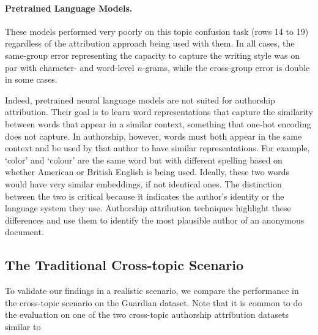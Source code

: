 \documentclass[11pt]{article}
\begin{document}
\paragraph{Pretrained Language Models.} These models performed very poorly on this topic confusion task (rows 14 to 19) regardless of the attribution approach being used with them. In all cases, the same-group error representing the capacity to capture the writing style was on par with character- and word-level $n$-grams, while the cross-group error is double in some cases. 

Indeed, pretrained neural language models are not suited for authorship attribution. Their goal is to learn word representations that capture the similarity between words that appear in a similar context, something that one-hot encoding does not capture. In authorship, however, words must both appear in the same context and be used by that author to have similar representations. For example, `color' and `colour' are the same word but with different spelling based on whether American or British English is being used. Ideally, these two words would have very similar embeddings, if not identical ones. The distinction between the two is critical because it indicates the author's identity or the language system they use. Authorship attribution techniques highlight these differences and use them to identify the most plausible author of an anonymous document. 

\subsection{The Traditional Cross-topic Scenario}
To validate our findings in a realistic scenario, we compare the performance in the cross-topic scenario on the Guardian dataset. Note that it is common to do the evaluation on one of the two cross-topic authorship attribution datasets~\citep{goldstein2009person,Stamatatos.E:2013} similar to~ \citep{goldstein2009person,Sapkota.U:2014,Stamatatos.E:2017, stamatatos2018masking,Barlas2020,Barlas2021}
\end{document}
